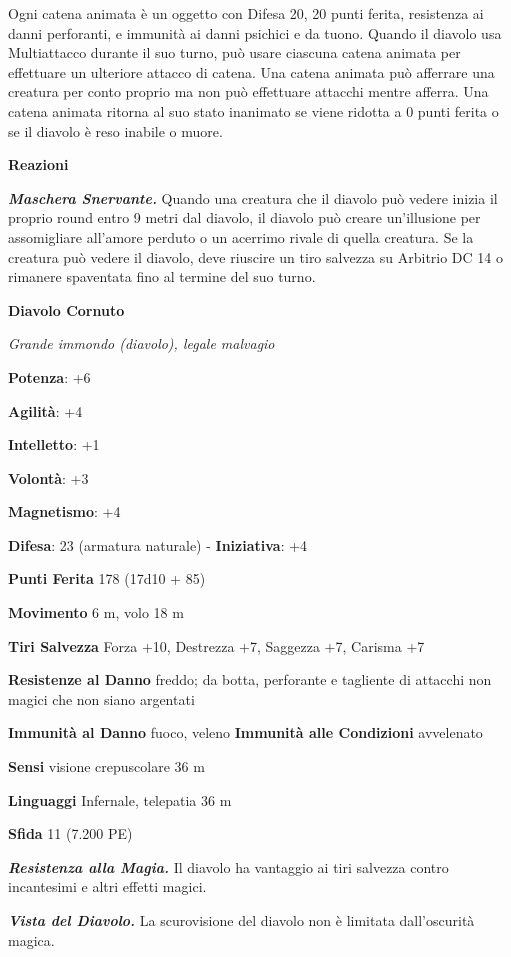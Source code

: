 \begin{multicols}{2}
Ogni catena animata è un oggetto con Difesa 20, 20 punti ferita, resistenza
ai danni perforanti, e immunità ai danni psichici e da tuono. Quando il
diavolo usa Multiattacco durante il suo turno, può usare ciascuna catena
animata per effettuare un ulteriore attacco di catena. Una catena
animata può afferrare una creatura per conto proprio ma non può
effettuare attacchi mentre afferra. Una catena animata ritorna al suo
stato inanimato se viene ridotta a 0 punti ferita o se il diavolo è reso
inabile o muore.

\textbf{Reazioni}

\emph{\textbf{Maschera Snervante.}} Quando una creatura che il diavolo
può vedere inizia il proprio round entro 9 metri dal diavolo, il diavolo
può creare un'illusione per assomigliare all'amore perduto o un acerrimo
rivale di quella creatura. Se la creatura può vedere il diavolo, deve
riuscire un tiro salvezza su Arbitrio DC 14 o rimanere spaventata fino
al termine del suo turno.

\textbf{Diavolo Cornuto}

\emph{Grande immondo (diavolo), legale malvagio}

\textbf{Potenza}: +6

\textbf{Agilità}: +4

\textbf{Intelletto}: +1

\textbf{Volontà}: +3

\textbf{Magnetismo}: +4

\textbf{Difesa}: 23 (armatura naturale) - \textbf{Iniziativa}: +4

\textbf{Punti Ferita} 178 (17d10 + 85)

\textbf{Movimento} 6 m, volo 18 m

\textbf{Tiri Salvezza} Forza +10, Destrezza +7, Saggezza +7, Carisma +7

\textbf{Resistenze al Danno} freddo; da botta, perforante e tagliente
di attacchi non magici che non siano argentati

\textbf{Immunità al Danno} fuoco, veleno \textbf{Immunità alle
Condizioni} avvelenato

\textbf{Sensi} visione crepuscolare 36 m

\textbf{Linguaggi} Infernale, telepatia 36 m 

\textbf{Sfida} 11 (7.200 PE)\smallskip

\emph{\textbf{Resistenza alla Magia.}} Il diavolo ha vantaggio ai tiri
salvezza contro incantesimi e altri effetti magici.

\emph{\textbf{Vista del Diavolo.}} La scurovisione del diavolo non è
limitata dall'oscurità magica.


\end{multicols}
